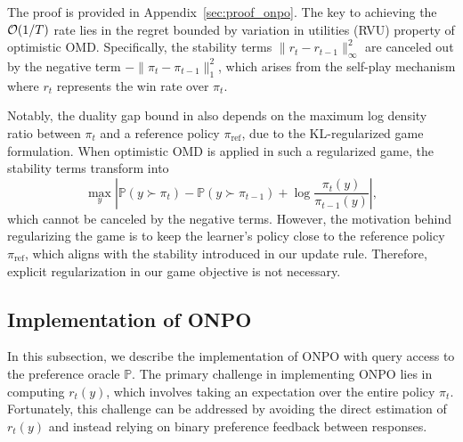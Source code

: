 The proof is provided in Appendix~\ref{sec:proof_onpo}. The key to achieving the $\mathcal O(1/T)$ rate lies in the regret bounded by variation in utilities (RVU) property of optimistic OMD. Specifically, the stability terms $\|r_t - r_{t-1}\|_{\infty}^2$ are canceled out by the negative term $-\|\pi_t - \pi_{t-1}\|_1^2$, which arises from the self-play mechanism where $r_t$ represents the win rate over $\pi_t$.  

Notably, the duality gap bound in \citet{zhang2024iterative} also depends on the maximum log density ratio between $\pi_t$ and a reference policy $\pi_{\mathrm{ref}}$, due to the KL-regularized game formulation. When optimistic OMD is applied in such a regularized game, the stability terms transform into  
$$
\max_y \left|\mathbb{P}(y \succ \pi_t) - \mathbb{P}(y \succ \pi_{t-1}) + \log \frac{\pi_t(y)}{\pi_{t-1}(y)}\right|,
$$ 
which cannot be canceled by the negative terms. However, the motivation behind regularizing the game is to keep the learner's policy close to the reference policy $\pi_{\mathrm{ref}}$, which aligns with the stability introduced in our update rule. Therefore, explicit regularization in our game objective is not necessary.

\subsection{Implementation of ONPO}
In this subsection, we describe the implementation of ONPO with query access to the preference oracle $\mathbb{P}$. The primary challenge in implementing ONPO lies in computing $r_t(y)$, which involves taking an expectation over the entire policy $\pi_t$. Fortunately, this challenge can be addressed by avoiding the direct estimation of $r_t(y)$ and instead relying on binary preference feedback between responses.

